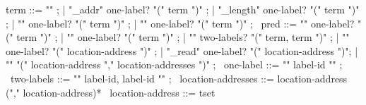 \begin{syntax}
  term ::= "\null" ;
        | "\base_addr" one-label? "(" term ")" ;
        | "\block_length" one-label? "(" term ")" ;
        | "\offset" one-label?  "(" term ")" ;
        | { "\allocation" } one-label?   "(" term ")" ;
       \
  pred ::=  "\allocable" one-label? "(" term ")" ;
       |  "\freeable" one-label? "(" term ")" ;
       | "\fresh"   two-labels? "(" term, term ")" ;
       | "\valid"  one-label?  "(" location-address ")" ;
       | "\valid_read"  one-label? "(" location-address ")";
       | "\separated" "(" location-address "," location-addresses ")" ;
       \
  one-label ::= "{" label-id "}" ;
       \
  two-labels ::= "{" label-id, label-id "}" ;
       \
  location-addresses ::= location-address ("," location-address)*
  \
  location-address ::= tset
\end{syntax}

